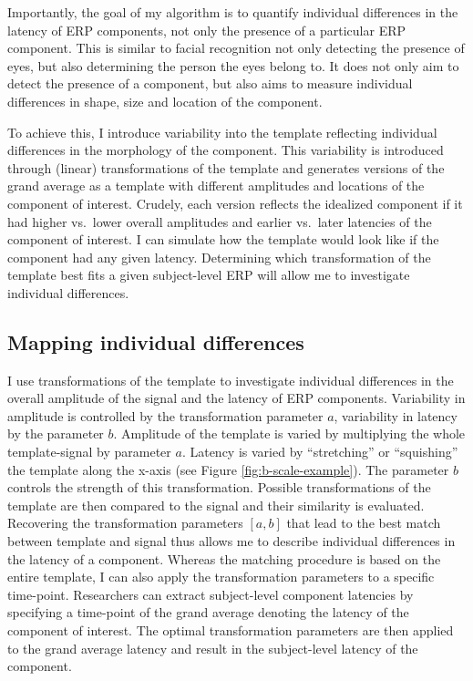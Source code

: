 \documentclass[
  man]{apa7}
\begin{document}
Importantly, the goal of my algorithm is to quantify individual differences in the latency of ERP components, not only the presence of a particular ERP component. This is similar to facial recognition not only detecting the presence of eyes, but also determining the person the eyes belong to. It does not only aim to detect the presence of a component, but also aims to measure individual differences in shape, size and location of the component.

To achieve this, I introduce variability into the template reflecting individual differences in the morphology of the component. This variability is introduced through (linear) transformations of the template and generates versions of the grand average as a template with different amplitudes and locations of the component of interest. Crudely, each version reflects the idealized component if it had higher vs.~lower overall amplitudes and earlier vs.~later latencies of the component of interest. I can simulate how the template would look like if the component had any given latency. Determining which transformation of the template best fits a given subject-level ERP will allow me to investigate individual differences.

\hypertarget{mapping-individual-differences}{%
\subsection{Mapping individual differences}\label{mapping-individual-differences}}

I use transformations of the template to investigate individual differences in the overall amplitude of the signal and the latency of ERP components. Variability in amplitude is controlled by the transformation parameter \(a\), variability in latency by the parameter \(b\). Amplitude of the template is varied by multiplying the whole template-signal by parameter \(a\). Latency is varied by ``stretching'' or ``squishing'' the template along the x-axis (see Figure \ref{fig:b-scale-example}). The parameter \(b\) controls the strength of this transformation. Possible transformations of the template are then compared to the signal and their similarity is evaluated. Recovering the transformation parameters \([a, b]\) that lead to the best match between template and signal thus allows me to describe individual differences in the latency of a component. Whereas the matching procedure is based on the entire template, I can also apply the transformation parameters to a specific time-point. Researchers can extract subject-level component latencies by specifying a time-point of the grand average denoting the latency of the component of interest. The optimal transformation parameters are then applied to the grand average latency and result in the subject-level latency of the component.
\end{document}
